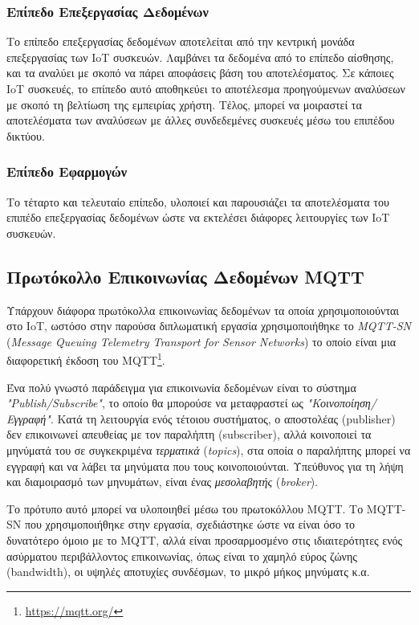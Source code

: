 \subsubsection{Επίπεδο Επεξεργασίας Δεδομένων}
\label{subsubsec:data_proc}

Το επίπεδο επεξεργασίας δεδομένων αποτελείται από την κεντρική μονάδα επεξεργασίας των IoT συσκευών. Λαμβάνει τα δεδομένα από το επίπεδο αίσθησης, και τα αναλύει με σκοπό να πάρει αποφάσεις βάση του αποτελέσματος. Σε κάποιες IoT συσκευές, το επίπεδο αυτό αποθηκεύει το αποτέλεσμα προηγούμενων αναλύσεων με σκοπό τη βελτίωση της εμπειρίας χρήστη. Τέλος, μπορεί να μοιραστεί τα αποτελέσματα των αναλύσεων με άλλες συνδεδεμένες συσκευές μέσω του επιπέδου δικτύου.

\subsubsection{Επίπεδο Εφαρμογών}
\label{subsubsec:application}

Το τέταρτο και τελευταίο επίπεδο, υλοποιεί και παρουσιάζει τα αποτελέσματα του επιπέδο επεξεργασίας δεδομένων ώστε να εκτελέσει διάφορες λειτουργίες των IoT συσκευών.

\subsection{Πρωτόκολλο Επικοινωνίας Δεδομένων MQTT}
\label{subsec:mqtt}

Υπάρχουν διάφορα πρωτόκολλα επικοινωνίας δεδομένων τα οποία χρησιμοποιούνται στο IoT, ωστόσο στην παρούσα διπλωματική εργασία χρησιμοποιήθηκε το \textit{MQTT-SN} (\textit{Message Queuing Telemetry Transport for Sensor Networks}) το οποίο είναι μια διαφορετική έκδοση του MQTT\footnote{\url{https://mqtt.org/}}.

Ένα πολύ γνωστό παράδειγμα για επικοινωνία δεδομένων είναι το σύστημα \textit{"Publish/Subscribe"}, το οποίο θα μπορούσε να μεταφραστεί ως \textit{"Κοινοποίηση/Εγγραφή"}. Κατά τη λειτουργία ενός τέτοιου συστήματος, ο αποστολέας (publisher) δεν επικοινωνεί απευθείας με τον παραλήπτη (subscriber), αλλά κοινοποιεί τα μηνύματά του σε συγκεκριμένα \textit{τερματικά} (\textit{topics}), στα οποία ο παραλήπτης μπορεί να εγγραφή και να λάβει τα μηνύματα που τους κοινοποιούνται. Υπεύθυνος για τη λήψη και διαμοιρασμό των μηνυμάτων, είναι ένας \textit{μεσολαβητής} (\textit{broker}).

Το πρότυπο αυτό μπορεί να υλοποιηθεί μέσω του πρωτοκόλλου MQTT. Το MQTT-SN που χρησιμοποιήθηκε στην εργασία, σχεδιάστηκε ώστε να είναι όσο το δυνατότερο όμοιο με το MQTT, αλλά είναι προσαρμοσμένο στις ιδιαιτερότητες ενός ασύρματου περιβάλλοντος επικοινωνίας, όπως είναι το χαμηλό εύρος ζώνης (bandwidth), οι υψηλές αποτυχίες συνδέσμων, το μικρό μήκος μηνύματς κ.α.